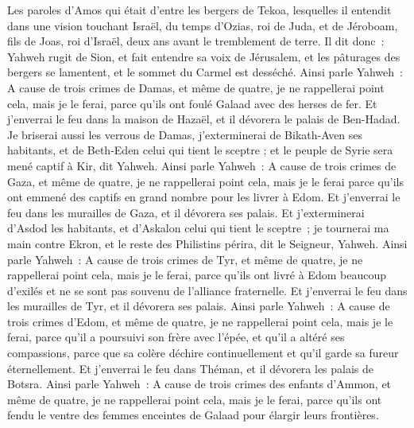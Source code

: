 \begin{multicols}{2}
\VerseOne{}Les paroles d'Amos qui était d'entre les bergers de Tekoa, lesquelles il entendit dans une vision touchant Israël, du temps d'Ozias, roi de Juda, et de Jéroboam, fils de Joas, roi d'Israël, deux ans avant le tremblement de terre.
Il dit donc~: Yahweh rugit de Sion, et fait entendre sa voix de Jérusalem, et les pâturages des bergers se lamentent, et le sommet du Carmel est desséché.
Ainsi parle Yahweh~: A cause de trois crimes de Damas, et même de quatre, je ne rappellerai point cela, mais je le ferai, parce qu'ils ont foulé Galaad avec des herses de fer.
Et j'enverrai le feu dans la maison de Hazaël, et il dévorera le palais de Ben-Hadad.
Je briserai aussi les verrous de Damas, j'exterminerai de Bikath-Aven ses habitants, et de Beth-Eden celui qui tient le sceptre ; et le peuple de Syrie sera mené captif à Kir, dit Yahweh.
Ainsi parle Yahweh~: A cause de trois crimes de Gaza, et même de quatre, je ne rappellerai point cela, mais je le ferai parce qu'ils ont emmené des captifs en grand nombre pour les livrer à Edom.
Et j'enverrai le feu dans les murailles de Gaza, et il dévorera ses palais.
Et j'exterminerai d'Asdod les habitants, et d'Askalon celui qui tient le sceptre~; je tournerai ma main contre Ekron, et le reste des Philistins périra, dit le Seigneur, Yahweh.
Ainsi parle Yahweh~: A cause de trois crimes de Tyr, et même de quatre, je ne rappellerai point cela, mais je le ferai, parce qu'ils ont livré à Edom beaucoup d'exilés et ne se sont pas souvenu de l'alliance fraternelle.
Et j'enverrai le feu dans les murailles de Tyr, et il dévorera ses palais.
Ainsi parle Yahweh~: A cause de trois crimes d'Edom, et même de quatre, je ne rappellerai point cela, mais je le ferai, parce qu'il a poursuivi son frère avec l'épée, et qu'il a altéré ses compassions, parce que sa colère déchire continuellement et qu'il garde sa fureur éternellement.
Et j'enverrai le feu dans Théman, et il dévorera les palais de Botsra.
Ainsi parle Yahweh~: A cause de trois crimes des enfants d'Ammon, et même de quatre, je ne rappellerai point cela, mais je le ferai, parce qu'ils ont fendu le ventre des femmes enceintes de Galaad pour élargir leurs frontières.

\end{multicols}
